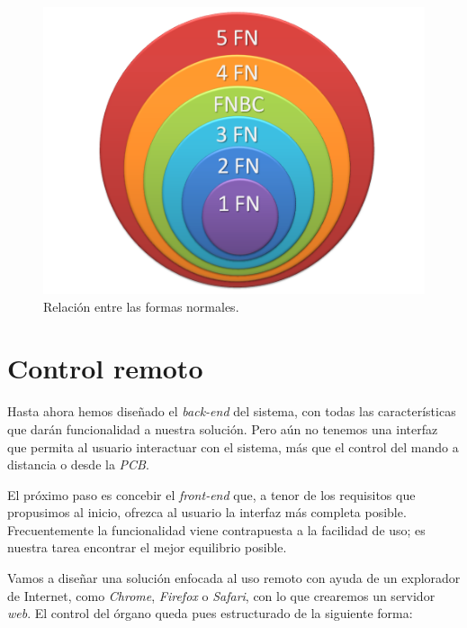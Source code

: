 \begin{figure}[H]
	\noindent \begin{centering}
		\includegraphics[width=\linewidth/2]{capitulo4/bd_fn}
		\par\end{centering}
	\smallskip
	\caption{\label{fig:bd_fn} Relación entre las formas normales.}
\end{figure} 

\smallskip

\section{Control remoto}

Hasta ahora hemos diseñado el \textit{back-end} del sistema, con todas las características que darán funcionalidad a nuestra solución. Pero aún no tenemos una interfaz que permita al usuario interactuar con el sistema, más que el control del mando a distancia o desde la \textit{PCB}.

El próximo paso es concebir el \textit{front-end} que, a tenor de los requisitos que propusimos al inicio, ofrezca al usuario la interfaz más completa posible. Frecuentemente la funcionalidad viene contrapuesta a la facilidad de uso; es nuestra tarea encontrar el mejor equilibrio posible.

Vamos a diseñar una solución enfocada al uso remoto con ayuda de un explorador de Internet, como \textit{Chrome}, \textit{Firefox} o \textit{Safari}, con lo que crearemos un servidor \textit{web}. El control del órgano queda pues estructurado de la siguiente forma:


